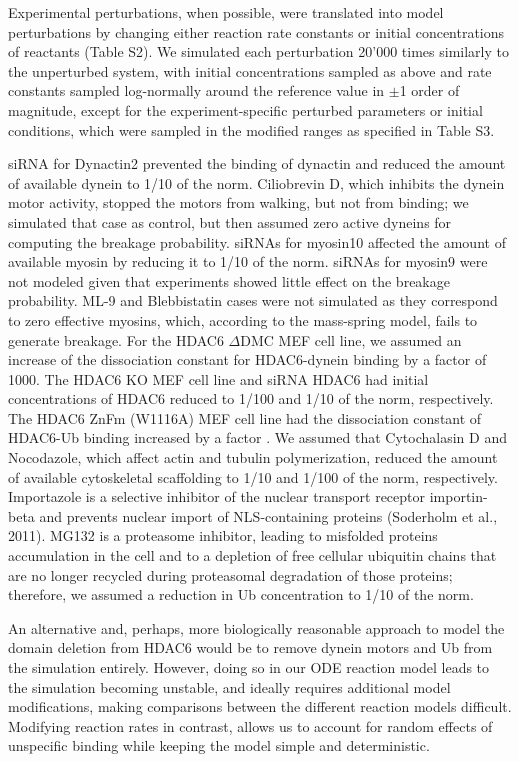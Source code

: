 Experimental perturbations, when possible, were translated into model perturbations by changing either reaction rate constants or initial concentrations of reactants (Table S2). We simulated each perturbation 20’000 times similarly to the unperturbed system, with initial concentrations sampled as above and rate constants sampled log-normally around the reference value in $\pm$1 order of magnitude, except for the experiment-specific perturbed parameters or initial conditions, which were sampled in the modified ranges as specified in Table S3.

siRNA for Dynactin2 prevented the binding of dynactin and reduced the amount of available dynein to 1/10 of the norm. Ciliobrevin D, which inhibits the dynein motor activity, stopped the motors from walking, but not from binding; we simulated that case as control, but then assumed zero active dyneins for computing the breakage probability. siRNAs for myosin10 affected the amount of available myosin by reducing it to 1/10 of the norm. siRNAs for myosin9 were not modeled given that experiments showed little effect on the breakage probability. ML-9 and Blebbistatin cases were not simulated as they correspond to zero effective myosins, which, according to the mass-spring model, fails to generate breakage. For the HDAC6 $\Delta$DMC MEF cell line, we assumed an increase of the dissociation constant for HDAC6-dynein binding by a factor of 1000. The HDAC6 KO MEF cell line and siRNA HDAC6 had initial concentrations of HDAC6 reduced to 1/100 and 1/10 of the norm, respectively. The HDAC6 ZnFm (W1116A) MEF cell line had the dissociation constant of HDAC6-Ub binding increased by a factor  . We assumed that Cytochalasin D and Nocodazole, which affect actin and tubulin polymerization, reduced the amount of available cytoskeletal scaffolding to 1/10 and 1/100 of the norm, respectively. Importazole is a selective inhibitor of the nuclear transport receptor importin-beta and prevents nuclear import of NLS-containing proteins (Soderholm et al., 2011). MG132 is a proteasome inhibitor, leading to misfolded proteins accumulation in the cell and to a depletion of free cellular ubiquitin chains that are no longer recycled during proteasomal degradation of those proteins; therefore, we assumed a reduction in Ub concentration to 1/10 of the norm.

An alternative and, perhaps, more biologically reasonable approach to model the domain deletion from HDAC6 would be to remove dynein motors and Ub from the simulation entirely. However, doing so in our ODE reaction model leads to the simulation becoming unstable, and ideally requires additional model modifications, making comparisons between the different reaction models difficult. Modifying reaction rates in contrast, allows us to account for random effects of unspecific binding while keeping the model simple and deterministic.

